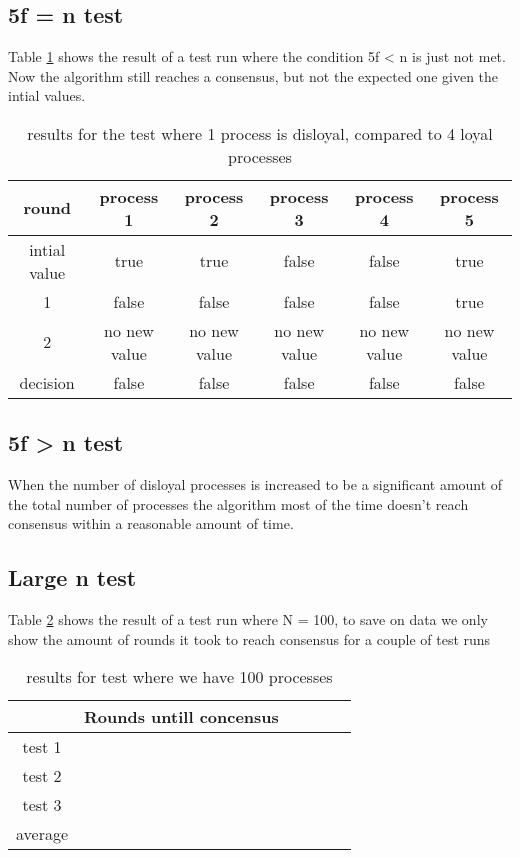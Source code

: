 \subsection{5f = n test}
Table \ref{table:resultsBoundaryDisloyal} shows the result of a test run where the condition 5f < n is just not met. 
Now the algorithm still reaches a consensus, but not the expected one given the intial values.


\begin{table}[h]
	\begin{tabular}{ | c | c  | c  | c| c | c |}
		\hline
  		round & process 1 & process 2 & process 3 & process 4 & process 5  \\
		\hline
 		intial value &  true & true & false  & false & true\\
		\hline
		1  &  false & false & false  & false & true  \\
		\hline
		2  &  no new value & no new value & no new value  & no new value & no new value \\
		\hline
  		decision  &  false & false & false  & false & false \\
		\hline
	\end{tabular}
	\caption{results for the test where 1 process is disloyal, compared to 4 loyal processes}	
	\label{table:resultsBoundaryDisloyal}
\end{table}

\subsection{5f > n test}
 
When the number of disloyal processes is  increased to be a significant amount of the total number of processes the algorithm most of the time doesn't reach consensus within a reasonable amount of time.

\subsection{Large n test}
Table \ref{table:resultsLargeN} shows the result of a test run where N = 100, to save on data we only show the amount of rounds it took to reach consensus for a couple of test runs



\begin{table}[h]
	\begin{tabular}{ | c | c  | c  | c| c | c |}
		\hline
  		 & Rounds untill concensus \\
		\hline
 		test 1 &   \\
		\hline
		test 2  &    \\
		\hline
		test 3  &    \\
		\hline
  		average  &    \\
		\hline
	\end{tabular}
	\caption{results for test where we have 100 processes}	
	\label{table:resultsLargeN}
\end{table}